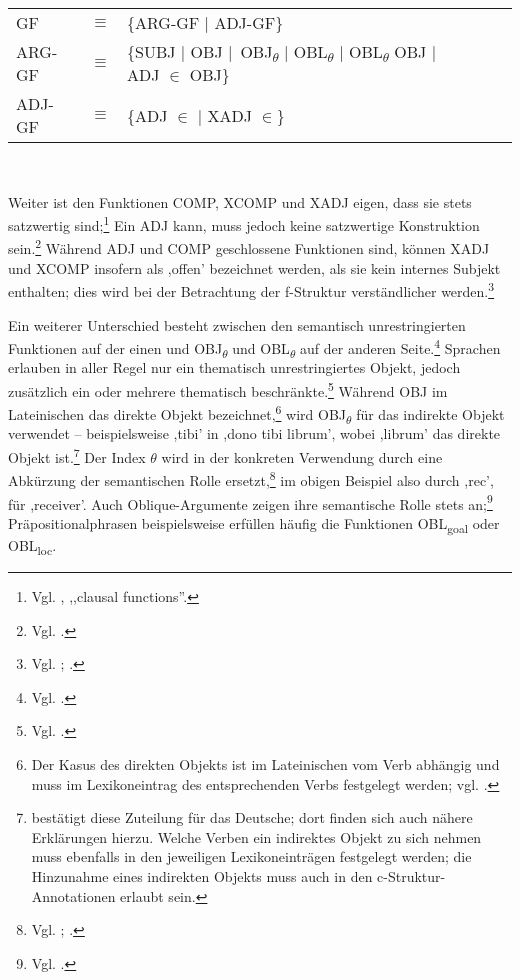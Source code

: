 \documentclass[12pt,a4paper]{article}
\begin{document}
\begin{singlespace}
\begin{tabular}{ l  l  l  c  c  c  c }
GF & $\equiv$ & \{ARG-GF $\mid$ ADJ-GF\} \\
ARG-GF & $\equiv$ & \{SUBJ $\mid$ OBJ $\mid$\ OBJ\textsubscript{$\theta$} $\mid$ OBL\textsubscript{$\theta$} $\mid$ OBL\textsubscript{$\theta$} OBJ $\mid$ ADJ $\in$ OBJ\} \\
ADJ-GF & $\equiv$ & \{ADJ $\in$ $\mid$ XADJ $\in$\} \\
\end{tabular}\\
\end{singlespace}

Weiter ist den Funktionen COMP, XCOMP und XADJ eigen, dass sie stets satzwertig sind;\footnote{Vgl. \cite[24]{Dal}, ,,clausal functions''.} Ein ADJ kann, muss jedoch keine satzwertige Konstruktion sein.\footnote{Vgl. \cite[40]{Skript}.} Während ADJ und COMP geschlossene Funktionen sind, können XADJ und XCOMP insofern als ,offen' bezeichnet werden, als sie kein internes Subjekt enthalten; dies wird bei der Betrachtung der f-Struktur verständlicher werden.\footnote{Vgl. \cite[10; 14; 24]{Dal}; \cite[54]{Skript}.}

Ein weiterer Unterschied besteht zwischen den semantisch unrestringierten Funktionen auf der einen und OBJ\textsubscript{$\theta$} und OBL\textsubscript{$\theta$} auf der anderen Seite.\footnote{Vgl. \cite[10; 15-7]{Dal}.} Sprachen erlauben in aller Regel nur ein thematisch unrestringiertes Objekt, jedoch zusätzlich ein oder mehrere thematisch beschränkte.\footnote{Vgl. \cite[21]{Dal}.} Während OBJ im Lateinischen das direkte Objekt bezeichnet,\footnote{Der Kasus des direkten Objekts ist im Lateinischen vom Verb abhängig und muss im Lexikoneintrag des entsprechenden Verbs festgelegt werden; vgl. \cite[30]{Skript}.} wird OBJ\textsubscript{$\theta$} für das indirekte Objekt verwendet – beispielsweise ,tibi' in ,dono tibi librum', wobei ,librum' das direkte Objekt ist.\footnote{\cite[30]{Skript} bestätigt diese Zuteilung für das Deutsche; dort finden sich auch nähere Erklärungen hierzu. Welche Verben ein indirektes Objekt zu sich nehmen muss ebenfalls in den jeweiligen Lexikoneinträgen festgelegt werden; die Hinzunahme eines indirekten Objekts muss auch in den c-Struktur-Annotationen erlaubt sein.} Der Index $\theta$ wird in der konkreten Verwendung durch eine Abkürzung der semantischen Rolle ersetzt,\footnote{Vgl. \cite[32]{Skript}; \cite[21]{Rohrer}.} im obigen Beispiel also durch ,rec', für ,receiver'. Auch Oblique-Argumente zeigen ihre semantische Rolle stets an;\footnote{Vgl. \cite[26]{Dal}.} Präpositionalphrasen beispielsweise erfüllen häufig die Funktionen OBL\textsubscript{goal} oder OBL\textsubscript{loc}.
\end{document}
